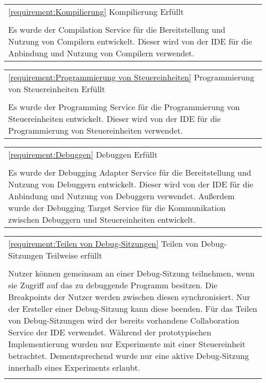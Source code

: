 \vfill
\begin{tabularx}{\textwidth}{X}
    \toprule
    \autoref{requirement:Kompilierung} \hfill Kompilierung \hfill Erfüllt
    \\
    \\
    Es wurde der Compilation Service für die Bereitstellung und Nutzung von Compilern entwickelt. Dieser wird von der IDE für die Anbindung und Nutzung von Compilern verwendet.
    \\
    \bottomrule
\end{tabularx}
\vfill
\begin{tabularx}{\textwidth}{X}
    \toprule
    \autoref{requirement:Programmierung von Steuereinheiten} \hfill Programmierung von Steuereinheiten  \hfill Erfüllt                                                    \\
    \\
    Es wurde der Programming Service für die Programmierung von Steuereinheiten entwickelt. Dieser wird von der IDE für die Programmierung von Steuereinheiten verwendet. \\
    \bottomrule
\end{tabularx}
\vfill
\begin{tabularx}{\textwidth}{X}
    \toprule
    \autoref{requirement:Debuggen} \hfill Debuggen \hfill Erfüllt
    \\
    \\
    Es wurde der Debugging Adapter Service für die Bereitstellung und Nutzung von Debuggern entwickelt. Dieser wird von der IDE für die Anbindung und Nutzung von Debuggern verwendet. Außerdem wurde der Debugging Target Service für die Kommunikation zwischen Debuggern und Steuereinheiten entwickelt.
    \\
    \bottomrule
\end{tabularx}
\vfill
\begin{tabularx}{\textwidth}{X}
    \toprule
    \autoref{requirement:Teilen von Debug-Sitzungen} \hfill Teilen von Debug-Sitzungen \hfill Teilweise erfüllt
    \\
    \\
    Nutzer können gemeinsam an einer Debug-Sitzung teilnehmen, wenn sie Zugriff auf das zu debuggende Programm besitzen. Die Breakpoints der Nutzer werden zwischen diesen synchronisiert. Nur der Ersteller einer Debug-Sitzung kann diese beenden. Für das Teilen von Debug-Sitzungen wird der bereits vorhandene Collaboration Service der IDE verwendet. Während der prototypischen Implementierung wurden nur Experimente mit einer Steuereinheit betrachtet. Dementsprechend wurde nur eine aktive Debug-Sitzung innerhalb eines Experiments erlaubt.
    \\
    \bottomrule \\
\end{tabularx}
